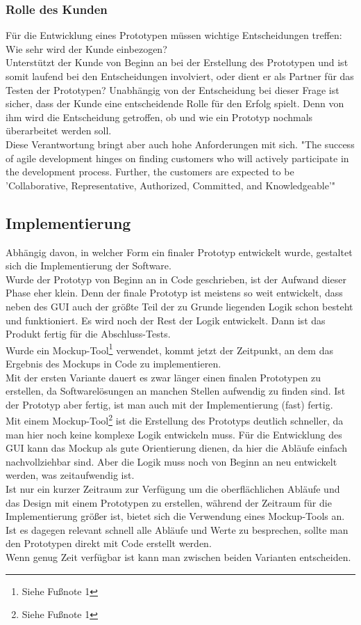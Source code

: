 \documentclass[a4paper,12pt,top=2.5cm,bottom=2.5cm, left=2.5cm, right=2.5cm, numbers=noenddot]{scrartcl}
\begin{document}
\subsubsection{Rolle des Kunden}
Für die Entwicklung eines Prototypen müssen wichtige Entscheidungen treffen: Wie sehr wird der Kunde einbezogen?
\\Unterstützt der Kunde von Beginn an bei der Erstellung des Prototypen und ist somit laufend bei den Entscheidungen involviert, oder dient er als Partner für das Testen der Prototypen? 
Unabhängig von der Entscheidung bei dieser Frage ist sicher, dass der Kunde eine entscheidende Rolle für den Erfolg spielt. Denn von ihm wird die Entscheidung getroffen, ob und wie ein Prototyp nochmals überarbeitet werden soll. \\
Diese Verantwortung bringt aber auch hohe Anforderungen mit sich. 
"The success of agile development hinges on finding customers who will actively participate in the development process. Further, the customers are expected to be 'Collaborative, Representative, Authorized, Committed, and Knowledgeable'" \cite{10.1145/1060710.1060712}
\subsection{Implementierung}
Abhängig davon, in welcher Form ein finaler Prototyp entwickelt wurde, gestaltet sich die Implementierung der Software.
\\Wurde der Prototyp von Beginn an in Code geschrieben, ist der Aufwand dieser Phase eher klein. Denn der finale Prototyp ist meistens so weit entwickelt, dass neben des GUI auch der größte Teil der zu Grunde liegenden Logik schon besteht und funktioniert. Es wird noch der Rest der Logik entwickelt. Dann ist das Produkt fertig für die Abschluss-Tests.\\Wurde ein Mockup-Tool\footnote{Siehe Fußnote 1} verwendet, kommt jetzt der Zeitpunkt, an dem das Ergebnis des Mockups in Code zu implementieren. 
\\Mit der ersten Variante dauert es zwar länger einen finalen Prototypen zu erstellen, da Softwarelösungen an manchen Stellen aufwendig zu finden sind. Ist der Prototyp aber fertig, ist man auch mit der Implementierung (fast) fertig. 
\\Mit einem Mockup-Tool\footnote{Siehe Fußnote 1} ist die Erstellung des Prototyps deutlich schneller, da man hier noch keine komplexe Logik entwickeln muss. Für die Entwicklung des GUI kann das Mockup als gute Orientierung dienen, da hier die Abläufe einfach nachvollziehbar sind. Aber die Logik muss noch von Beginn an neu entwickelt werden, was zeitaufwendig ist. 
\\Ist nur ein kurzer Zeitraum zur Verfügung um die oberflächlichen Abläufe und das Design mit einem Prototypen zu erstellen, während der Zeitraum für die Implementierung größer ist, bietet sich die Verwendung eines Mockup-Tools an. Ist es dagegen relevant schnell alle Abläufe und Werte zu besprechen, sollte man den Prototypen direkt mit Code erstellt werden.\\
Wenn genug Zeit verfügbar ist kann man zwischen beiden Varianten entscheiden.
\end{document}

